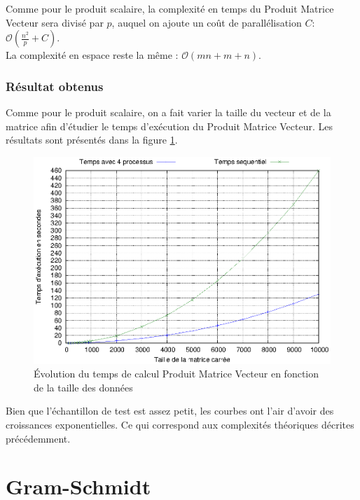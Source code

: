 \documentclass[a4paper]{article}
\begin{document}
Comme pour le produit scalaire, la complexité en temps du Produit Matrice Vecteur sera divisé par $p$, auquel on ajoute un coût de parallélisation $C$: \textbf{$\mathcal{O}(\frac{n^2}{p} + C)$}.\\
La complexité en espace reste la même : \textbf{$\mathcal{O}(mn + m + n)$}.



\section{Résultat obtenus}

Comme pour le produit scalaire, on a fait varier la taille du vecteur et de la matrice afin d'étudier le temps d'exécution du Produit Matrice Vecteur. Les résultats sont présentés dans la figure \ref{fig:courbe_pmv}.

\begin{figure}[h]
	\begin{center}
		\includegraphics[scale=0.80]{Courbes/pmv_temps_taille.eps}
	\end{center}
   	\caption{Évolution du temps de calcul Produit Matrice Vecteur en fonction de la taille des données}
	\label{fig:courbe_pmv}
\end{figure}

\FloatBarrier

Bien que l'échantillon de test est assez petit, les courbes ont l'air d'avoir des croissances exponentielles. Ce qui correspond aux complexités théoriques décrites précédemment.

\part{Gram-Schmidt}
\end{document}
